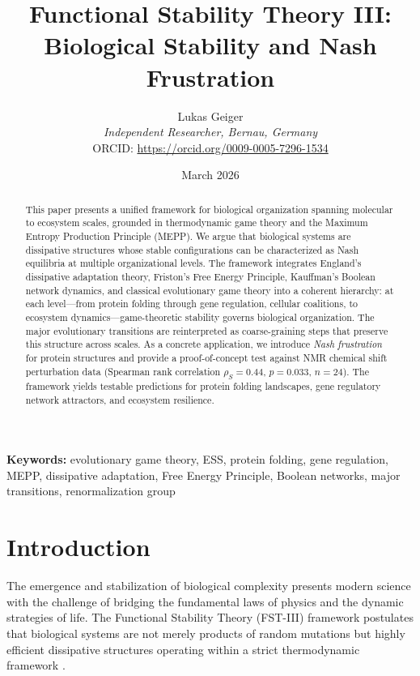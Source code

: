\documentclass[12pt,a4paper]{article}
\title{Functional Stability Theory III: Biological Stability and Nash Frustration}
\author{Lukas Geiger\\
\textit{Independent Researcher, Bernau, Germany}\\
ORCID: \url{https://orcid.org/0009-0005-7296-1534}}
\date{March 2026}
\theoremstyle{remark}
\begin{document}
\maketitle

\begin{abstract}
This paper presents a unified framework for biological organization spanning molecular to ecosystem scales, grounded in thermodynamic game theory and the Maximum Entropy Production Principle (MEPP). We argue that biological systems are dissipative structures whose stable configurations can be characterized as Nash equilibria at multiple organizational levels. The framework integrates England's dissipative adaptation theory, Friston's Free Energy Principle, Kauffman's Boolean network dynamics, and classical evolutionary game theory into a coherent hierarchy: at each level---from protein folding through gene regulation, cellular coalitions, to ecosystem dynamics---game-theoretic stability governs biological organization. The major evolutionary transitions are reinterpreted as coarse-graining steps that preserve this structure across scales. As a concrete application, we introduce \emph{Nash frustration} for protein structures and provide a proof-of-concept test against NMR chemical shift perturbation data (Spearman rank correlation $\rho_S = 0.44$, $p = 0.033$, $n = 24$). The framework yields testable predictions for protein folding landscapes, gene regulatory network attractors, and ecosystem resilience.
\end{abstract}

\textbf{Keywords:} evolutionary game theory, ESS, protein folding, gene regulation, MEPP, dissipative adaptation, Free Energy Principle, Boolean networks, major transitions, renormalization group

\section{Introduction}
\label{sec:introduction}

The emergence and stabilization of biological complexity presents modern science with the challenge of bridging the fundamental laws of physics and the dynamic strategies of life. The Functional Stability Theory (FST-III) framework postulates that biological systems are not merely products of random mutations but highly efficient dissipative structures operating within a strict thermodynamic framework \citep{EcosystemMEPP}.
\end{document}
